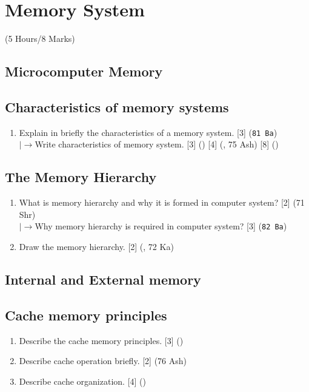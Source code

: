 \documentclass[12pt]{article}
\newcommand{\lb}{\\$\left|\rightarrow\right.$}
\begin{document}
\section{Memory System}
	\begin{center}(5 Hours/8 Marks)\end{center}
	\subsection{Microcomputer Memory}
	\subsection{Characteristics of memory systems}
		\begin{enumerate}
			\item Explain in briefly the characteristics of a memory system. \hfill [3] (\texttt{81 Ba})
			\lb Write characteristics of memory system. \hfill [3] () [4] (, 75 Ash) [8] ()
		\end{enumerate}

	\subsection{The Memory Hierarchy}
		\begin{enumerate}
			\item What is memory hierarchy and why it is formed in computer system? \hfill [2] (71 Shr)
			\lb Why memory hierarchy is required in computer system? \hfill [3] (\texttt{82 Ba})
			
			\item Draw the memory hierarchy. \hfill [2] (, 72 Ka)
		\end{enumerate}

	\subsection{Internal and External memory}
	\subsection{Cache memory principles}
		\begin{enumerate}
			\item Describe the cache memory principles. \hfill [3] ()

			\item Describe cache operation briefly. \hfill [2] (76 Ash)

			\item Describe cache organization. \hfill [4] ()
		\end{enumerate}
\end{document}
